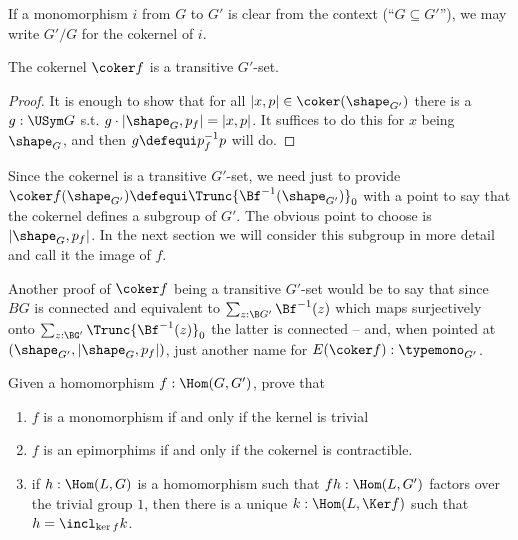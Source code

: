 If a monomorphism $i$ from $G$ to $G'$ is clear from the context (``$G\subseteq G'$''), we may write $G'/G$ for the cokernel of $i$.
\begin{lemma}
  \label{lem:coker is transitive}
  The cokernel $\coker f$ is a transitive $G'$-set.
\end{lemma}
\begin{proof}
  It is enough to show that for all $|x,p|\in\coker(\shape_{G'})$ there is a $g:\USym G$ s.t. $g\cdot |\shape_G,p_f|= |x,p|$.  It suffices to do this for $x$ being $\shape_G$, and then $g\defequi p_f^{-1}p$ will do.
\end{proof}
\begin{remark}
  \label{remark:imageandcokernel}
  Since the cokernel is a transitive $G'$-set, we need just to provide $\coker f(\shape_{G'})\defequi\Trunc{\Bf^{-1}(\shape_{G'})}_0$ with a point to say that the cokernel defines a subgroup of $G'$. The obvious point to choose is $|\shape_G,p_f|$. In the next section we will consider this subgroup in more detail and call it the image of $f$.

Another proof of $\coker f$ being a transitive $G'$-set would be to say that since $BG$ is connected and equivalent to $\sum_{z:\B G'}\Bf^{-1}(z)$ which maps surjectively onto $\sum_{z:\BG'}\Trunc{\Bf^{-1}(z)}_0$ the latter is connected -- and, when pointed at $(\shape_{G'},|\shape_G,p_f|)$, just another name for $E(\coker f):\typemono_{G'}$.
\end{remark}


\begin{xca}
  Given a homomorphism $f:\Hom(G,G')$, prove that
  \begin{enumerate}
  \item $f$ is a monomorphism if and only if the kernel is trivial
  \item $f$ is an epimorphims if and only if the cokernel is contractible.
  \item if $h:\Hom(L,G)$ is a homomorphism such that $fh:\Hom(L,G')$ factors over the trivial group $1$, then there is a unique $k:\Hom(L,\Ker f)$ such that $h=\incl_{\ker f}k$.
  \end{enumerate}
\end{xca}


